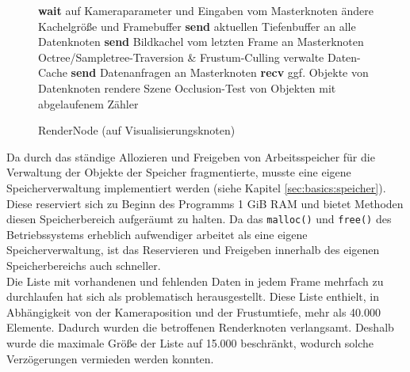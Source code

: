 \begin{figure}[ttt!]
\centering
 \begin{minipage}[t]{13cm}
\begin{algorithm}[H]
  \caption{RenderNode (auf Visualisierungsknoten)\label{alg:impl:rendernode}} 
    \begin{algorithmic} [1]
	\STATE \textbf{wait} auf Kameraparameter und Eingaben vom Masterknoten
	  \STATE ändere Kachelgröße und Framebuffer
	  \STATE \textbf{send} aktuellen Tiefenbuffer an alle Datenknoten
	\ENDIF
	\STATE \textbf{send} Bildkachel vom letzten Frame an Masterknoten
	\STATE Octree/Sampletree-Traversion \& Frustum-Culling
	\STATE verwalte Daten-Cache
	\STATE \textbf{send} Datenanfragen an Masterknoten
	\STATE \textbf{recv} ggf. Objekte von Datenknoten
	\STATE rendere Szene
	\STATE Occlusion-Test von Objekten mit abgelaufenem Zähler
      \ENDWHILE
    \end{algorithmic}
\end{algorithm}
 \end{minipage}
\end{figure}
Da durch das ständige Allozieren und Freigeben von Arbeitsspeicher für die Verwaltung der Objekte der Speicher fragmentierte, musste eine eigene Speicherverwaltung implementiert werden (siehe Kapitel \ref{sec:basics:speicher}). Diese reserviert sich zu Beginn des Programms 1 GiB RAM und bietet Methoden diesen Speicherbereich aufgeräumt zu halten. Da das \verb|malloc()| und \verb|free()| des Betriebssystems erheblich aufwendiger arbeitet als eine eigene Speicherverwaltung, ist das Reservieren und Freigeben innerhalb des eigenen Speicherbereichs auch schneller.\\
Die Liste mit vorhandenen und fehlenden Daten in jedem Frame mehrfach zu durchlaufen hat sich als problematisch herausgestellt. Diese Liste enthielt, in Abhängigkeit von der Kameraposition und der Frustumtiefe, mehr als 40.000 Elemente. Dadurch wurden die betroffenen Renderknoten verlangsamt. Deshalb wurde die maximale Größe der Liste auf 15.000 beschränkt, wodurch solche Verzögerungen vermieden werden konnten.

